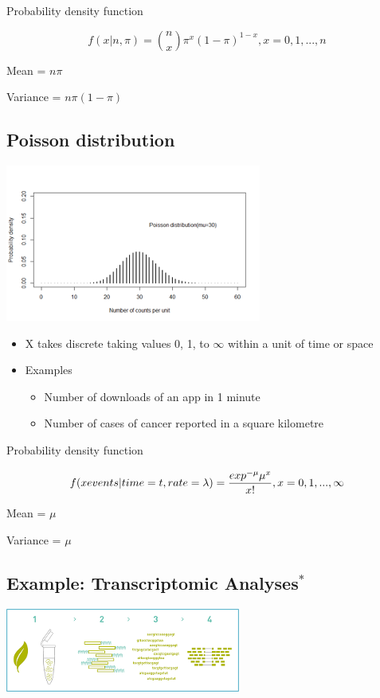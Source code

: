 \documentclass[
]{book}
\providecommand{\tightlist}{%
  \setlength{\itemsep}{0pt}\setlength{\parskip}{0pt}}
\begin{document}
Probability density function

\[f(x|n,\pi)={n\choose x}\pi^x(1-\pi)^{1-x},x=0,1,...,n\]

Mean = \(n\pi\)

Variance = \(n\pi(1-\pi)\)

\hypertarget{poisson-distribution}{%
\subsection{Poisson distribution}\label{poisson-distribution}}

\includegraphics[width=0.5\linewidth]{./2_62}

\begin{itemize}
\tightlist
\item
  X takes discrete taking values 0, 1, to \(\infty\) within a unit of time or space
\item
  Examples

  \begin{itemize}
  \tightlist
  \item
    Number of downloads of an app in 1 minute
  \item
    Number of cases of cancer reported in a square kilometre
  \end{itemize}
\end{itemize}

Probability density function

\[f(x\space events|time=t,rate=\lambda)=\frac{exp^{-\mu}\mu^x}{x!},x=0,1,...,\infty\]

Mean = \(\mu\)

Variance = \(\mu\)

\hypertarget{example-transcriptomic-analyses}{%
\subsection{\texorpdfstring{Example: Transcriptomic Analyses\(^*\)}{Example: Transcriptomic Analyses\^{}*}}\label{example-transcriptomic-analyses}}

\includegraphics[width=0.5\linewidth]{./2_63}
\end{document}
